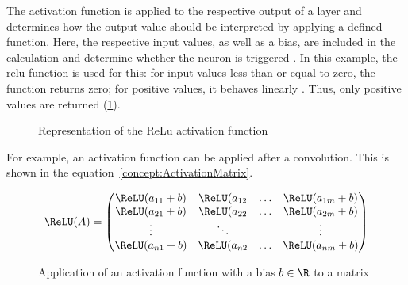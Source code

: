 {The activation function is applied to the respective output of a layer and determines how the output value should be interpreted by applying a defined function. Here, the respective input values, as well as a bias, are included in the calculation and determine whether the neuron is triggered \cite{Nwankpa:2018}. In this example, the \ac{relu} function is used for this: for input values less than or equal to zero, the function returns zero; for positive values, it behaves linearly \cite{Agarap:2018}. Thus, only positive values are returned (\cref{fig:relu}).

\begin{figure}
    \centering
    \caption{Representation of the ReLu activation function}
    \label{fig:relu}
\end{figure}

For example, an activation function can be applied after a convolution. This is shown in the equation~\ref{concept:ActivationMatrix}.


    \begin{figure}
    
    $$
      \ReLU(A) 
      = 
      \left(
        \begin{matrix}
          \ReLU(a_{11}+b) & \ReLU(a_{12} & \ldots & \ReLU(a_{1m}+b)\\
          \ReLU(a_{21}+b) & \ReLU(a_{22} & \ldots & \ReLU(a_{2m}+b)\\
             \vdots       & \ddots       &        &   \vdots \\
          \ReLU(a_{n1}+b) & \ReLU(a_{n2} & \ldots & \ReLU(a_{nm}+b)\\
    \end{matrix}
    \right)
    $$
    
    \caption{Application of an activation function with a bias $b \in \R$ to a matrix}\label{concept:AktivierungMatrix}
    

\end{figure}}
